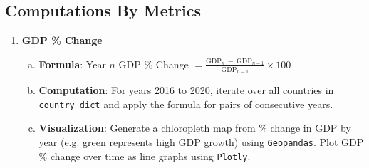 \documentclass[fontsize=11pt]{article}
\begin{document}
    \subsection*{Computations By Metrics}
    \begin{enumerate}
        \item \textbf{GDP \% Change}
            \begin{enumerate}[(a)]
                \item \textbf{Formula}: Year $n$ GDP \% Change $= \frac{\text{GDP}_{n} \ - \ \text{GDP}_{n-1}}{\text{GDP}_{n-1}} \times 100$
                \item \textbf{Computation}: For years 2016 to 2020, iterate over all countries in \texttt{country\_dict} and apply the formula for pairs of consecutive years.
                \item \textbf{Visualization}: Generate a chloropleth map from \% change in GDP by year (e.g. green represents high GDP growth) using \texttt{Geopandas}. Plot GDP \% change over time as line graphs using \texttt{Plotly}.
            \end{enumerate}


\end{enumerate}
\end{document}
